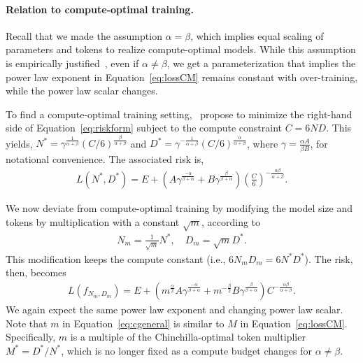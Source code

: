 \begin{appendix}
\paragraph{Relation to compute-optimal training.}

Recall that we made the assumption $\alpha=\beta$, which implies equal scaling of parameters and tokens to realize compute-optimal models.
While this assumption is empirically justified~\cite{chinchilla}, even if $\alpha \neq \beta$, we get a parameterization that implies the power law exponent in Equation~\eqref{eq:lossCM} remains constant with over-training, while the power law scalar changes.

To find a compute-optimal training setting,~\citet{chinchilla} propose to minimize the right-hand side of Equation~\eqref{eq:riskform} subject to the compute constraint $C = 6ND$. This yields, 
$
N^\ast = \gamma^{\frac{1}{\alpha + \beta}} (C/6)^{\frac{\beta}{\alpha + \beta}}
$ and 
$
D^\ast = \gamma^{-\frac{1}{\alpha + \beta}} (C/6)^{\frac{\alpha}{\alpha + \beta}}$, where $\gamma = \frac{\alpha A}{ \beta B}$, for notational convenience. 
The associated risk is,
\begin{align*}
L(N^\ast,D^\ast)
= E + \left( A\gamma^{\frac{-\alpha}{\beta+\alpha}} + B \gamma^{\frac{\beta}{\beta+\alpha}} \right) \left(\frac{C}{6}\right)^{-\frac{\alpha \beta}{\alpha + \beta}}.
\end{align*}

We now deviate from compute-optimal training by modifying the model size and tokens by multiplication with a constant $\sqrt{m}$, according to 
\begin{align}
\label{eq:tokenmtp}
N_m = \frac{1}{\sqrt{m}} N^\ast, 
\quad
D_m = \sqrt{m} D^\ast.
\end{align}
This modification keeps the compute constant (i.e., $6N_m D_m = 6N^\ast D^\ast$). The risk, then, becomes 
\begin{align}
\label{eq:cgeneral}
L(f_{N_m,D_m})
= E 
+ \left(m^{\frac{\alpha}{2}} A\gamma^{\frac{-\alpha}{\beta+\alpha}} + m^{-\frac{\beta}{2}} B \gamma^{\frac{\beta}{\beta+\alpha}} \right) C^{-\frac{\alpha \beta}{\alpha + \beta}}.
\end{align}
We again expect the same power law exponent and changing power law scalar. 
Note that $m$ in Equation~\eqref{eq:cgeneral} is similar to $M$ in Equation~\eqref{eq:lossCM}. Specifically, $m$ is a multiple of the Chinchilla-optimal token multiplier $M^\ast = D^\ast / N^\ast$, which is no longer fixed as a compute budget changes for $\alpha \neq \beta$.
\clearpage


\end{appendix}
